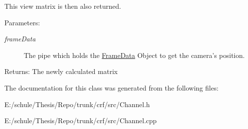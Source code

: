 This view matrix is then also returned. \begin{Desc}
\item[Parameters:]
\begin{description}
\item[{\em frameData}]The pipe which holds the \hyperlink{a00010}{FrameData} Object to get the camera's position. \end{description}
\end{Desc}
\begin{Desc}
\item[Returns:]The newly calculated matrix \end{Desc}


The documentation for this class was generated from the following files:\begin{CompactItemize}
\item 
E:/schule/Thesis/Repo/trunk/crf/src/Channel.h\item 
E:/schule/Thesis/Repo/trunk/crf/src/Channel.cpp\end{CompactItemize}
